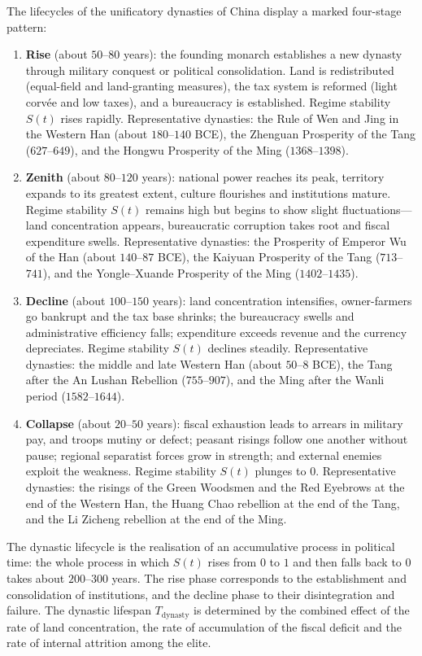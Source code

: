 \begin{definition}\label{def:dynasty_lifecycle}
The lifecycles of the unificatory dynasties of China display a marked four-stage pattern:
\begin{enumerate}[label=(\roman*)]
    \item \textbf{Rise} (about $50$--$80$ years): the founding monarch establishes a new dynasty through military conquest or political consolidation. Land is redistributed (equal-field and land-granting measures), the tax system is reformed (light corvée and low taxes), and a bureaucracy is established. Regime stability $S(t)$ rises rapidly. Representative dynasties: the Rule of Wen and Jing in the Western Han (about $180$--$140$ BCE), the Zhenguan Prosperity of the Tang ($627$--$649$), and the Hongwu Prosperity of the Ming ($1368$--$1398$).
    \item \textbf{Zenith} (about $80$--$120$ years): national power reaches its peak, territory expands to its greatest extent, culture flourishes and institutions mature. Regime stability $S(t)$ remains high but begins to show slight fluctuations---land concentration appears, bureaucratic corruption takes root and fiscal expenditure swells. Representative dynasties: the Prosperity of Emperor Wu of the Han (about $140$--$87$ BCE), the Kaiyuan Prosperity of the Tang ($713$--$741$), and the Yongle--Xuande Prosperity of the Ming ($1402$--$1435$).
    \item \textbf{Decline} (about $100$--$150$ years): land concentration intensifies, owner-farmers go bankrupt and the tax base shrinks; the bureaucracy swells and administrative efficiency falls; expenditure exceeds revenue and the currency depreciates. Regime stability $S(t)$ declines steadily. Representative dynasties: the middle and late Western Han (about $50$--$8$ BCE), the Tang after the An Lushan Rebellion ($755$--$907$), and the Ming after the Wanli period ($1582$--$1644$).
    \item \textbf{Collapse} (about $20$--$50$ years): fiscal exhaustion leads to arrears in military pay, and troops mutiny or defect; peasant risings follow one another without pause; regional separatist forces grow in strength; and external enemies exploit the weakness. Regime stability $S(t)$ plunges to $0$. Representative dynasties: the risings of the Green Woodsmen and the Red Eyebrows at the end of the Western Han, the Huang Chao rebellion at the end of the Tang, and the Li Zicheng rebellion at the end of the Ming.
\end{enumerate}
The dynastic lifecycle is the realisation of an accumulative process in political time: the whole process in which $S(t)$ rises from $0$ to $1$ and then falls back to $0$ takes about $200$--$300$ years. The rise phase corresponds to the establishment and consolidation of institutions, and the decline phase to their disintegration and failure. The dynastic lifespan $T_{\text{dynasty}}$ is determined by the combined effect of the rate of land concentration, the rate of accumulation of the fiscal deficit and the rate of internal attrition among the elite.
\end{definition}

